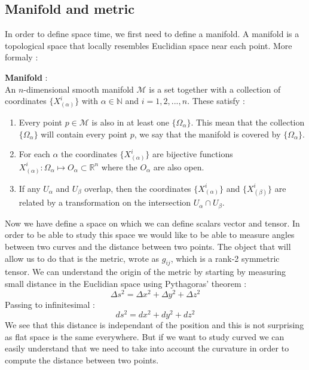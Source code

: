 \documentclass[a4paper,12pt]{article}
\theoremstyle{definition}
\begin{document}
\subsection{Manifold and metric}
In order to define space time, we first need to define a manifold.
A manifold is a topological space that locally resembles Euclidian space near each point.
More formaly :
\begin{definition}
	\textbf{Manifold} :\\
	An $n$-dimensional smooth manifold $\mathcal{M}$ is a set together with a collection of coordinates $\{ X^i_{(\alpha)}\}$
	with $\alpha \in \mathbb{N}$ and $i=1,2,...,n$. These satisfy :
	\begin{enumerate}
		\item Every point $p\in\mathcal{M}$ is also in at least one $\{\Omega_\alpha\}$.
		This mean that the collection $\{\Omega_\alpha\}$ will contain every point $p$,
		we say that the manifold is covered by $\{\Omega_\alpha\}$.
		\item For each $\alpha$ the coordinates $\{ X^i_{(\alpha)}\}$ are bijective functions $X^i_{(\alpha)}:\Omega_\alpha \mapsto O_\alpha \subset \mathbb{R}^n$
		where the $O_\alpha$ are also open.
		\item If any $U_\alpha$ and $U_\beta$ overlap, then the coordinates $\{ X^i_{(\alpha)}\}$ and $\{ X^i_{(\beta)}\}$
		are related by a  transformation on the intersection $U_\alpha \cap U_\beta$.
	\end{enumerate}
\end{definition}
Now we have define a space on which we can define scalars vector and tensor.
In order to be able to study this space we would like to be able to measure angles between two curves and the distance between two points.
The object that will allow us to do that is the metric, wrote as $g_{ij}$, which is a rank-2 symmetric tensor.
We can understand the origin of the metric by starting by measuring small distance in the Euclidian space using Pythagoras' theorem :
\begin{equation}
	\Delta s^2= \Delta x^2 + \Delta y^2 + \Delta z^2
\end{equation}
Passing to infinitesimal :
\begin{equation}\label{dist}
	ds^2= dx^2 + dy^2 + dz^2
\end{equation}
We see that this distance is independant of the position and this is not surprising as flat space is the same everywhere.
But if we want to study curved we can easily understand that we need to take into account the curvature in order to compute the distance between two points.\\
\end{document}
